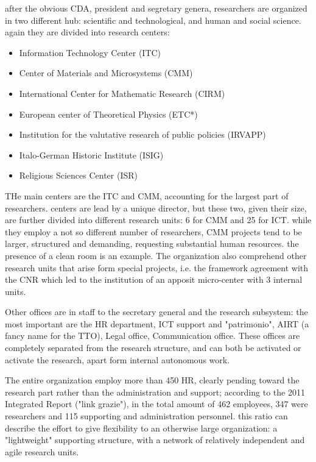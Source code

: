 after the obvious CDA, president and segretary genera, researchers are organized in two different hub: scientific and technological, and human and social science. again they are divided into research centers:

\begin{itemize}

\item Information Technology Center (ITC)
\item Center of Materials and Microsystems (CMM)
\item International Center for Mathematic Research (CIRM)
\item European center of Theoretical Physics (ETC*)
\item Institution for the valutative research of public policies (IRVAPP)
\item Italo-German Historic Institute (ISIG)
\item Religious Sciences Center (ISR)

\end{itemize}

THe main centers are the ITC and CMM, accounting for the largest part of researchers. centers are lead by a unique director, but these two, given their size, are further divided into different research units: 6 for CMM and 25 for ICT. while they employ a not so different number of researchers, CMM projects tend to be larger, structured and demanding, requesting substantial human resources. the presence of a clean room is an example. The organization also comprehend other research units that arise form special projects, i.e. the framework agreement with the CNR which led to the institution of an apposit micro-center with 3 internal units.

Other offices are in staff to the secretary general and the research subsystem: the most important are the HR department, ICT support and "patrimonio", AIRT (a fancy name for the TTO), Legal office, Communication office. These offices are completely separated from the research structure, and can both be activated or activate the research, apart form internal autonomous work. 

The entire organization employ more than 450 HR, clearly pending toward the research part rather than the administration and support; according to the 2011 Integrated Report ("link grazie"), in the total amount of 462 employees, 347 were researchers and 115 supporting and administration personnel. this ratio can describe the effort to give flexibility to an otherwise large organization: a "lightweight" supporting structure, with a network of relatively independent and agile research units.    

